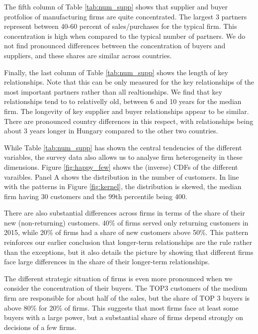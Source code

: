 \documentclass[final, dvipsnames, authoryear,12pt]{elsarticle}
\begin{document}
The fifth column of Table \ref{tab:num_supp} shows that supplier and buyer protfolios of manufacturing firms are quite concentrated. The largest 3 partners represent between 40-60 percent of sales/purchases for the typical firm. This concentration is high when compared to the typical number of partners. We do not find pronounced differences between the concentration of buyers and suppliers, and these shares are similar across countries.

Finally, the last column of Table \ref{tab:num_supp} shows the length of key relationships. Note that this can be only measured for the key relationships of the most important partners rather than all realtionships. We find that key relationships tend to to relativelly old, between 6 and 10 years for the median firm. The longevity of key supplier and buyer relationships appear to be similar. There are pronounced country differences in this respect, with relationships being about 3 years longer in Hungary compared to the other two countries. 

While Table \ref{tab:num_supp} has shown the central tendencies of the different variables, the survey data also allows us to analyse firm heterogeneity in these dimensions. Figure \ref{fig:happy_few} shows the (inverse) CDFs of the different varaibles. Panel A shows the distribution in the number of customers. In line with the patterns in Figure \ref{fig:kernel}, the distribution is skewed, the median firm having 30 customers and the 99th percentile being 400.

There are also substantial differences across firms in terms of the share of their new (non-returning) customers. 40\% of firms served only returning customers in 2015, while 20\% of firms had a share of new customers above 50\%. This pattern reinforces our earlier conclusion that longer-term relationships are the rule rather than the exceptions, but it also details the picture by showing that different firms face large differences in the share of their longer-term relationships.

The different strategic situation of firms is even more pronounced when we consider the concentration of their buyers. The TOP3 customers of the medium firm are responsible for about half of the sales, but the share of TOP 3 buyers is above 80\% for 20\% of firms. This suggests that most firms face at least some buyers with a large power, but a substantial share of firms depend strongly on decisions of a few firms.
\end{document}
